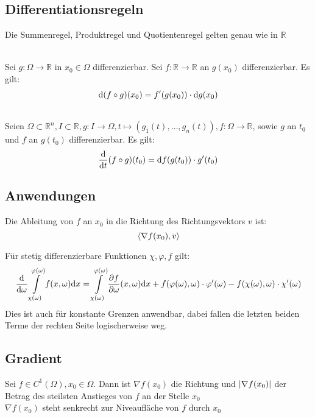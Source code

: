 	\subsection{Differentiationsregeln}
		\begin{proofhelp}
			Die Summenregel, Produktregel und Quotientenregel gelten genau wie in $\mathbb{R}$
		\end{proofhelp}
		\begin{theorem}[Kettenregel 1]
			\hfill \\
			Sei $g:\Omega\to\mathbb{R}$ in $x_0 \in\Omega$ differenzierbar. Sei $f:\mathbb{R}\to\mathbb{R}$ an $g(x_0)$ differenzierbar. Es gilt:
			$$ \mathrm{d} (f \circ g)(x_0) = f^\prime(g(x_0)) \cdot \mathrm{d} g(x_0)$$
		\end{theorem}
		\begin{theorem}[Kettenregel 2]
			\hfill \\
			Seien $\Omega \subset \mathbb{R}^n, I \subset \mathbb{R}, g: I \to \Omega, t \mapsto (g_1(t), \dots , g_n(t)), f: \Omega \to \mathbb{R}$, sowie $g$ an $t_0$ und $f$ an $g(t_0)$ differenzierbar. Es gilt:
			$$ \diff{}{t}(f \circ g)(t_0) = \d f(g(t_0)) \cdot g^\prime(t_0)$$
		\end{theorem}
	\subsection{Anwendungen}
		\begin{theorem}[Richtungsableitung]
			Die Ableitung von $f$ an $x_0$ in die Richtung des  Richtungsvektors $v$ ist:
			$$ \left\langle \nabla f(x_0), v \right\rangle $$
		\end{theorem}
		\begin{theorem}
			Für stetig differenzierbare Funktionen $\chi, \varphi, f$ gilt:
			$$ \diff{}{\omega}\int\limits_{\chi(\omega)}^{\varphi(\omega)}f(x, \omega) \d x = \int\limits_{\chi(\omega)}^{\varphi(\omega)} \pdiff{f}{\omega}(x,\omega) \d x + f(\varphi(\omega),\omega)\cdot\varphi^\prime(\omega) - f(\chi(\omega),\omega)\cdot\chi^\prime(\omega)$$
			Dies ist auch für konstante Grenzen anwendbar, dabei fallen die letzten beiden Terme der rechten Seite logischerweise weg.
		\end{theorem}
	\subsection{Gradient}
		\begin{proofhelp}
			Sei $f \in C^1(\Omega), x_0 \in \Omega$. Dann ist $\nabla f(x_0)$ die Richtung und $\left\vert \nabla f(x_0) \right\vert$ der Betrag des steilsten Anstieges von $f$ an der Stelle $x_0$ \\
			$\nabla f(x_0)$ steht senkrecht zur Niveaufläche von $f$ durch $x_0$
		\end{proofhelp}
